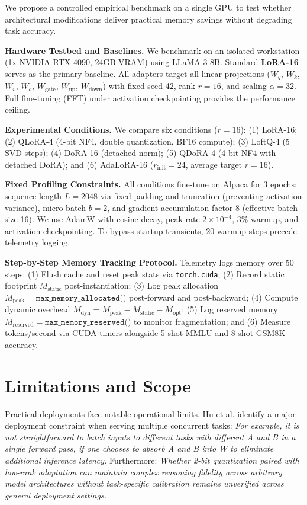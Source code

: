 \documentclass[11pt,a4paper]{article}
\begin{document}
We propose a controlled empirical benchmark on a single GPU to test whether architectural modifications deliver practical memory savings without degrading task accuracy.

\textbf{Hardware Testbed and Baselines.} We benchmark on an isolated workstation (1x NVIDIA RTX 4090, 24GB VRAM) using LLaMA-3-8B. Standard \textbf{LoRA-16} serves as the primary baseline. All adapters target all linear projections ($W_q$, $W_k$, $W_v$, $W_o$, $W_{\text{gate}}$, $W_{\text{up}}$, $W_{\text{down}}$) with fixed seed 42, rank $r=16$, and scaling $\alpha=32$. Full fine-tuning (FFT) under activation checkpointing provides the performance ceiling.

\textbf{Experimental Conditions.} We compare six conditions ($r=16$): (1) LoRA-16; (2) QLoRA-4 (4-bit NF4, double quantization, BF16 compute); (3) LoftQ-4 (5 SVD steps); (4) DoRA-16 (detached norm); (5) QDoRA-4 (4-bit NF4 with detached DoRA); and (6) AdaLoRA-16 ($r_{\text{init}}=24$, average target $r=16$).

\textbf{Fixed Profiling Constraints.} All conditions fine-tune on Alpaca for 3 epochs: sequence length $L=2048$ via fixed padding and truncation (preventing activation variance), micro-batch $b=2$, and gradient accumulation factor 8 (effective batch size 16). We use AdamW with cosine decay, peak rate $2 \times 10^{-4}$, $3\%$ warmup, and activation checkpointing. To bypass startup transients, 20 warmup steps precede telemetry logging.

\textbf{Step-by-Step Memory Tracking Protocol.} Telemetry logs memory over 50 steps: (1) Flush cache and reset peak stats via \texttt{torch.cuda}; (2) Record static footprint $M_{\text{static}}$ post-instantiation; (3) Log peak allocation $M_{\text{peak}} = \texttt{max\_memory\_allocated()}$ post-forward and post-backward; (4) Compute dynamic overhead $M_{\text{dyn}} = M_{\text{peak}} - M_{\text{static}} - M_{\text{opt}}$; (5) Log reserved memory $M_{\text{reserved}} = \texttt{max\_memory\_reserved()}$ to monitor fragmentation; and (6) Measure tokens/second via CUDA timers alongside 5-shot MMLU and 8-shot GSM8K accuracy.

\section{Limitations and Scope}

Practical deployments face notable operational limits. Hu et al. identify a major deployment constraint when serving multiple concurrent tasks: \textit{For example, it is not straightforward to batch inputs to different tasks with different A and B in a single forward pass, if one chooses to absorb A and B into W to eliminate additional inference latency.} \cite{hu2021lora} Furthermore: \textit{Whether 2-bit quantization paired with low-rank adaptation can maintain complex reasoning fidelity across arbitrary model architectures without task-specific calibration remains unverified across general deployment settings.}
\end{document}
